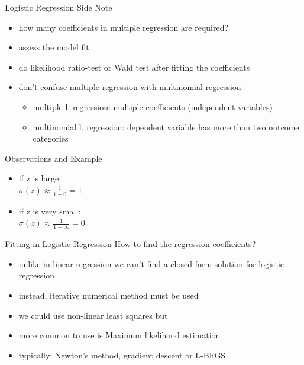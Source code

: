 \documentclass{beamer}
\begin{document}
\begin{frame}{Logistic Regression Side Note}
\begin{itemize}
\item how many coefficients in multiple regression are required? 
\item assess the model fit
\item do likelihood ratio-test or Wald test after fitting the coefficients
\item don't confuse multiple regression with multinomial regression
  \begin{itemize}
  \item multiple l. regression: multiple coefficients (independent variables)
  \item multinomial l. regression: dependent variable has more than two outcome categories
  \end{itemize}
\end{itemize}

\end{frame}


\begin{frame}{Observations and Example}
\begin{itemize}
\item if z is large:\\
$\sigma(z)\approx\frac{1}{1+0}=1$
\item if z is very small:\\
$\sigma(z)\approx\frac{1}{1+\infty}=0$
\end{itemize}

\end{frame}

\begin{frame}{Fitting in Logistic Regression}
How to find the regression coefficients?
\begin{itemize}
\item unlike in linear regression we can't find a closed-form solution for logistic regression
\item instead, iterative numerical method must be used
\item we could use non-linear least squares but
\item more common to use is Maximum likelihood estimation
\item typically: Newton's method, gradient descent or L-BFGS
\end{itemize}
\end{frame}
\end{document}
